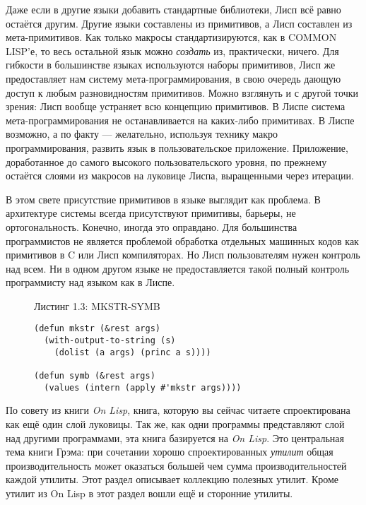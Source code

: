Даже если в другие языки добавить стандартные библиотеки, Лисп всё равно остаётся другим. Другие языки составлены из примитивов, а Лисп составлен из мета-примитивов. Как только макросы стандартизируются, как в COMMON LISP'е, то весь остальной язык можно \emph{создать} из, практически, ничего. Для гибкости в большинстве языках используются наборы примитивов, Лисп же предоставляет нам систему мета-программирования, в свою очередь дающую доступ к любым разновидностям примитивов. Можно взглянуть и с другой точки зрения: Лисп вообще устраняет всю концепцию примитивов. В Лиспе система мета-программирования не останавливается на каких-либо примитивах. В Лиспе возможно, а по факту --- желательно, используя технику макро программирования, развить язык в пользовательское приложение. Приложение, доработанное до самого высокого пользовательского уровня, по прежнему остаётся слоями из макросов на луковице Лиспа, выращенными через итерации.

В этом свете присутствие примитивов в языке выглядит как проблема. В архитектуре системы всегда присутствуют примитивы, барьеры, не ортогональность. Конечно, иногда это оправдано. Для большинства программистов не является проблемой обработка отдельных машинных кодов как примитивов в C или Лисп компиляторах. Но Лисп пользователям нужен контроль над всем. Ни в одном другом языке не предоставляется такой полный контроль программисту над языком как в Лиспе.

\begin{figure}Листинг 1.3: MKSTR-SYMB\label{listing_1.3}
\listbegin
\begin{verbatim}
(defun mkstr (&rest args)
  (with-output-to-string (s)
    (dolist (a args) (princ a s))))

(defun symb (&rest args)
  (values (intern (apply #'mkstr args))))
\end{verbatim}
\listend
\end{figure}

По совету из книги \emph{On Lisp}, книга, которую вы сейчас читаете спроектирована как ещё один слой луковицы. Так же, как одни программы представляют слой над другими программами, эта книга базируется на \emph{On Lisp}. Это центральная тема книги Грэма: при сочетании хорошо спроектированных \emph{утилит} общая производительность может оказаться большей чем сумма производительностей каждой утилиты. Этот раздел описывает коллекцию полезных утилит. Кроме утилит из On Lisp в этот раздел вошли ещё и сторонние утилиты.

